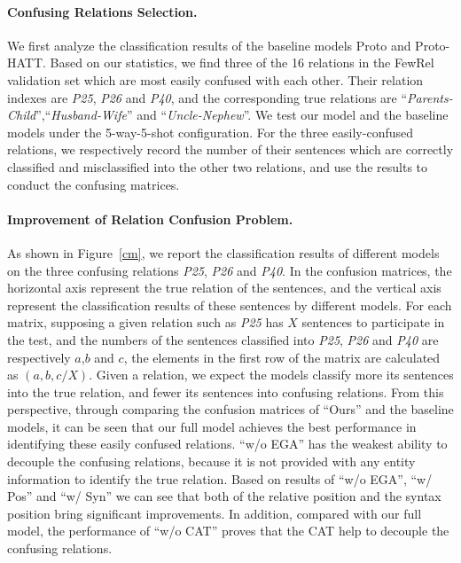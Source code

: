 \documentclass[11pt]{article}
\begin{document}
\paragraph{Confusing Relations Selection.} 
We first analyze the classification results of the baseline models Proto and Proto-HATT. Based on our statistics, we find three of the 16 relations in the FewRel validation set which are most easily confused with each other. Their relation indexes are \textit{P25}, \textit{P26} and \textit{P40}, and the corresponding true relations are ``\textit{Parents-Child}'',``\textit{Husband-Wife}'' and ``\textit{Uncle-Nephew}''. We test our model and the baseline models under the 5-way-5-shot configuration. For the three easily-confused relations, we respectively record the number of their sentences which are correctly classified and misclassified into the other two relations, and use the results to conduct the confusing matrices. 

\paragraph{Improvement of Relation Confusion Problem.} 
As shown in Figure~\ref{cm}, we report the classification results of different models on the three confusing relations \textit{P25}, \textit{P26} and \textit{P40}. In the confusion matrices, the horizontal axis represent the true relation of the sentences, and the vertical axis represent the classification results of these sentences by different models. For each matrix, supposing a given relation such as \textit{P25} has $X$ sentences to participate in the test, and the numbers of the sentences classified into \textit{P25}, \textit{P26} and \textit{P40} are respectively $a$,$b$ and $c$, the elements in the first row of the matrix are calculated as $(a,b,c/X)$.  Given a relation, we expect the models classify more its sentences into the true relation, and fewer its sentences into confusing relations. From this perspective, through comparing the confusion matrices of ``Ours'' and the baseline models, it can be seen that our full model achieves the best performance in identifying these easily confused relations. ``w/o EGA'' has the weakest ability to decouple the confusing relations, because it is not provided with any entity information to identify the true relation. Based on results of ``w/o EGA'', ``w/ Pos'' and ``w/ Syn'' we can see that both of the relative position and the syntax position bring significant improvements. In addition, compared with our full model, the performance of ``w/o CAT'' proves that the CAT help to decouple the confusing relations.
\end{document}
